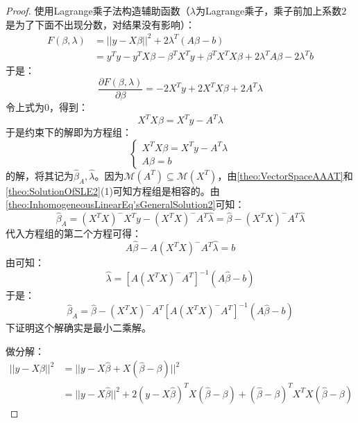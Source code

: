 \begin{proof}
	使用Lagrange乘子法构造辅助函数（$\lambda$为Lagrange乘子，乘子前加上系数$2$是为了下面不出现分数，对结果没有影响）：
	\begin{align*}
		F(\beta,\lambda)&=||y-X\beta||^2+2\lambda^T(A\beta-b) \\
		&=y^Ty-y^TX\beta-\beta^TX^Ty+\beta^TX^TX\beta+2\lambda^TA\beta-2\lambda^Tb
	\end{align*}
	于是：
	\begin{equation*}
		\frac{\partial F(\beta,\lambda)}{\partial\beta}=-2X^Ty+2X^TX\beta+2A^T\lambda
	\end{equation*}
	令上式为$0$，得到：
	\begin{equation*}
		X^TX\beta=X^Ty-A^T\lambda
	\end{equation*}
	于是约束下的解即为方程组：
	\begin{equation*}
		\begin{cases}
			X^TX\beta=X^Ty-A^T\lambda \\
			A\beta=b
		\end{cases}
	\end{equation*}
	的解，将其记为$\hat{\beta}_A,\hat{\lambda}$。因为$\mathcal{M}(A^T)\subseteq\mathcal{M}(X^T)$，由\cref{theo:VectorSpaceAAAT}和\cref{theo:SolutionOfSLE2}(1)可知方程组是相容的。由\cref{theo:InhomogeneousLinearEq'sGeneralSolution2}可知：
	\begin{equation*}
		\hat{\beta}_A=(X^TX)^-X^Ty-(X^TX)^-A^T\hat{\lambda}=\hat{\beta}-(X^TX)^-A^T\hat{\lambda}
	\end{equation*}
	代入方程组的第二个方程可得：
	\begin{equation*}
		A\hat{\beta}-A(X^TX)^-A^T\hat{\lambda}=b
	\end{equation*}
	由可知：
	\begin{equation*}
		\hat{\lambda}=[A(X^TX)^-A^T]^{-1}(A\hat{\beta}-b)
	\end{equation*}
	于是：
	\begin{equation*}
		\hat{\beta}_A=\hat{\beta}-(X^TX)^-A^T[A(X^TX)^-A^T]^{-1}(A\hat{\beta}-b)
	\end{equation*}
	下证明这个解确实是最小二乘解。\par
	做分解：
	\begin{align*}
		||y-X\beta||^2
		&=||y-X\hat{\beta}+X(\hat{\beta}-\beta)||^2 \\
		&=||y-X\hat{\beta}||^2+2(y-X\hat{\beta})^TX(\hat{\beta}-\beta)+(\hat{\beta}-\beta)^TX^TX(\hat{\beta}-\beta)
	\end{align*}

\end{proof}
